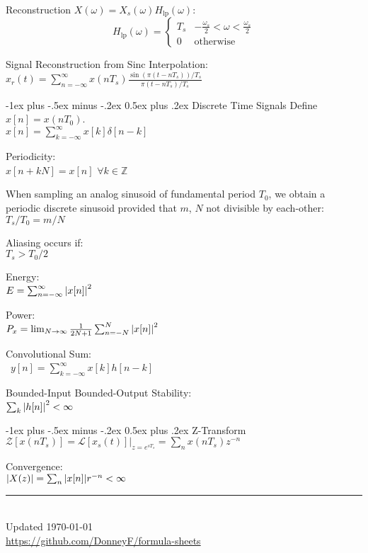 \documentclass[12pt,landscape]{article}
\makeatletter
\renewcommand{\section}{\@startsection{section}{1}{0mm}%
                                {-1ex plus -.5ex minus -.2ex}%
                                {0.5ex plus .2ex}%
                                {\normalfont\normalsize\bfseries}}
\newcommand{\tab}{\hspace{.02\textwidth}}
\makeatother
\begin{document}
\begin{multicols*}{3}
Reconstruction $X(\omega)=X_s(\omega)H_\text{lp}(\omega)$:
\begin{equation*}
H_{\text{lp}}(\omega) =
\begin{cases}
T_s & -\frac{\omega_s}{2} < \omega < \frac{\omega_s}{2}\\
0 & \text{otherwise}
\end{cases}
\end{equation*}

Signal Reconstruction from Sinc Interpolation:\\
\tab $x_r(t) = \sum_{n=-\infty}^{\infty} x(nT_s) \frac{\sin(\pi(t-nT_s))/T_s}{\pi(t-nT_s)/T_s}$
\end{multicols*}

\newpage

\begin{minipage}[t]{0.30\textwidth}
\section{Discrete Time Signals}
\tab Define $x[n] = x(nT_0)$.\\
\tab $x[n] = \sum_{k=-\infty}^{\infty}x[k]\delta[n-k]$

Periodicity:\\
\tab $x[n + kN] = x[n]$ \qquad $\forall k\in \mathbb{Z}$

When sampling an analog sinusoid of fundamental period $T_0$, we obtain a periodic discrete sinusoid provided that $m$, $N$ not divisible by each-other:\\
\tab $T_s/T_0 = m/N$

Aliasing occurs if:\\
\tab $T_s > T_0/2$

Energy:\\
\tab $E = \sum_{n = -\infty}^{\infty}\abs{x[n]}^2$

Power:\\
\tab $ P_x = \lim_{N \rightarrow \infty}\frac{1}{2N + 1}\sum_{n= -N}^{N}\abs{x[n]}^2$

Convolutional Sum:\\\
\tab $y[n] = \sum_{k = -\infty}^{\infty} x[k]h[n-k]$

Bounded-Input Bounded-Output Stability:\\
\tab $\sum_k \abs{h[n]}^2 < \infty$

\section{Z-Transform}
\tab $\mathcal{Z}[x(nT_s)] = \mathcal{L}[x_s(t)]\rvert_{z=e^{sT_s}} = \sum_n x(nT_s)z^{-n}$

Convergence:\\
\tab $|X(z)| = \sum_n \abs{x[n]}r^{-n} < \infty$
\rule{0.3\linewidth}{0.25pt}
\scriptsize\\
Updated \today\\
\href{https://github.com/DonneyF/formula-sheets}{https://github.com/DonneyF/formula-sheets}
\end{minipage}%
\end{document}
